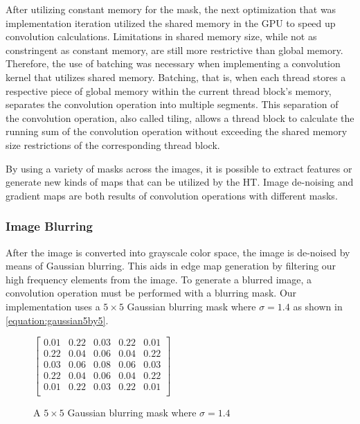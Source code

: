 \documentclass[conference]{IEEEtran}
\begin{document}
After utilizing constant memory for the mask, the next optimization that was implementation iteration utilized the shared memory in the GPU to speed up convolution calculations.
Limitations in shared memory size, while not as constringent as constant memory, are still more restrictive than global memory.
Therefore, the use of batching was necessary when implementing a convolution kernel that utilizes shared memory. 
Batching, that is, when each thread stores a respective piece of global memory within the current thread block's memory, separates the convolution operation into multiple segments.
This separation of the convolution operation, also called tiling, allows a thread block to calculate the running sum of the convolution operation without exceeding the shared memory size restrictions of the corresponding thread block.










By using a variety of masks across the images, it is possible to extract features or generate new kinds of maps that can be utilized by the HT\@.
Image de-noising and gradient maps are both results of convolution operations with different masks.

\subsubsection{Image Blurring}
After the image is converted into grayscale color space, the image is de-noised by means of Gaussian blurring.
This aids in edge map generation by filtering our high frequency elements from the image.
To generate a blurred image, a convolution operation must be performed with a blurring mask. 
Our implementation uses a $5 \times 5$ Gaussian blurring mask where $\sigma = 1.4$ as shown in \autoref{equation:gaussian5by5}.
\begin{figure}[h] %
  \centering
  $\begin{bmatrix}
  0.01 & 0.22 & 0.03 & 0.22 & 0.01 \\
  0.22 & 0.04 & 0.06 & 0.04 & 0.22 \\
  0.03 & 0.06 & 0.08 & 0.06 & 0.03 \\
  0.22 & 0.04 & 0.06 & 0.04 & 0.22 \\
  0.01 & 0.22 & 0.03 & 0.22 & 0.01 \\
\end{bmatrix}$\caption{A $5 \times 5$ Gaussian blurring mask where $\sigma = 1.4$}\label{equation:gaussian5by5}
\end{figure}
\end{document}
